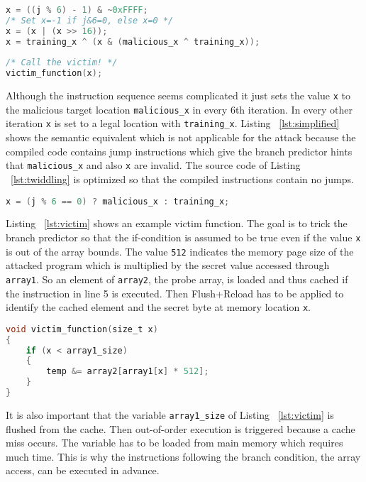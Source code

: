 \documentclass[a4paper,oneside,openright] {scrreprt}
\begin{document}
\begin{lstlisting}[language=C, caption=Spectre: Branch Predictor Tricking, label={lst:twiddling}]
x = ((j % 6) - 1) & ~0xFFFF;
/* Set x=-1 if j&6=0, else x=0 */
x = (x | (x >> 16));
x = training_x ^ (x & (malicious_x ^ training_x));
    
/* Call the victim! */
victim_function(x);
\end{lstlisting}

Although the instruction sequence seems complicated it just sets the value \texttt{x} to the malicious target location 
\texttt{malicious\_x} in every 6th iteration. In every other iteration \texttt{x} is set to a legal location with \texttt{training\_x}.
Listing ~\ref{lst:simplified} shows the semantic equivalent which is not applicable for the attack because the compiled code
contains jump instructions which give the branch predictor hints that \texttt{malicious\_x} and also \texttt{x} are invalid.
The source code of Listing ~\ref{lst:twiddling} is optimized so that the compiled instructions contain no jumps.

\begin{lstlisting}[language=C, caption=Spectre: Branch Predictor Tricking Simplified, label={lst:simplified}]
x = (j % 6 == 0) ? malicious_x : training_x;
\end{lstlisting}

Listing ~\ref{lst:victim} shows an example victim function. The goal is to trick the branch predictor so that the if-condition is 
assumed to be true even if the value \texttt{x} is out of the array bounds. The value \texttt{512} indicates the memory page size of the
attacked program which is multiplied by the secret value accessed through \texttt{array1}. So an element of \texttt{array2}, the probe array, is loaded
and thus cached if the instruction in line 5 is executed. Then Flush+Reload has to be applied to identify the cached element
and the secret byte at memory location \texttt{x}.

\begin{lstlisting}[language=C, caption=Spectre: Example Victim Gadget, label={lst:victim}]
void victim_function(size_t x)
{
    if (x < array1_size)
    {
        temp &= array2[array1[x] * 512];
    }
}
\end{lstlisting}

It is also important that the variable \texttt{array1\_size} of Listing ~\ref{lst:victim} is flushed from the cache.
Then out-of-order execution is triggered because a cache miss occurs.
The variable has to be loaded from main memory which requires much time. 
This is why the instructions following the branch condition, the array access, can be executed in advance.
\end{document}
